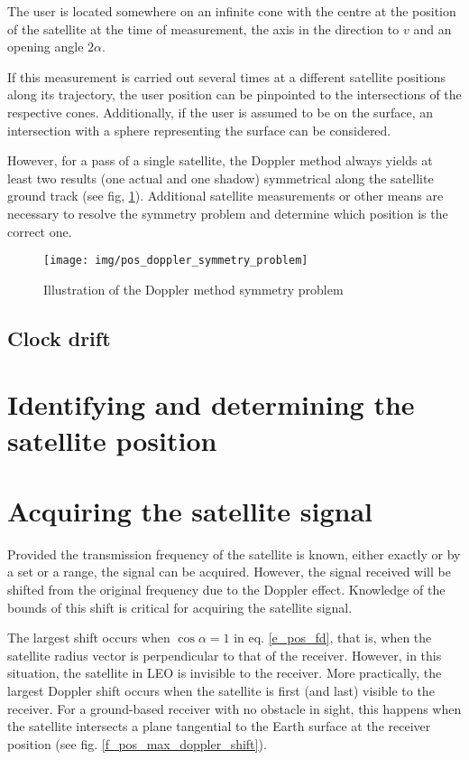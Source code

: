 The user is located somewhere on an infinite cone with the centre at the position of the satellite at the time of measurement, the axis in the direction to $v$ and an opening angle $2\alpha$.

If this measurement is carried out several times at a different satellite positions along its trajectory, the user position can be pinpointed to the intersections of the respective cones. Additionally, if the user is assumed to be on the surface, an intersection with a sphere representing the surface can be considered.

However, for a pass of a single satellite, the Doppler method always yields at least two results (one actual and one shadow) symmetrical along the satellite ground track (see fig, \ref{f_pos_doppler_symmetry_problem}). Additional satellite measurements or other means are necessary to resolve the symmetry problem and determine which position is the correct one.

\begin{figure}
    \centering
    \texttt{[image: img/pos\_doppler\_symmetry\_problem]}
    \caption{Illustration of the Doppler method symmetry problem\cite{sop09}}
    \label{f_pos_doppler_symmetry_problem}
\end{figure}

\subsection{Clock drift}


\section{Identifying and determining the satellite position}

\section{Acquiring the satellite signal}
Provided the transmission frequency of the satellite is known, either exactly or by a set or a range, the signal can be acquired. However, the signal received will be shifted from the original frequency due to the Doppler effect. Knowledge of the bounds of this shift is critical for acquiring the satellite signal.

The largest shift occurs when $\cos{\alpha} = 1$ in eq. \ref{e_pos_fd}, that is, when the satellite radius vector is perpendicular to that of the receiver. However, in this situation, the satellite in LEO is invisible to the receiver. More practically, the largest Doppler shift occurs when the satellite is first (and last) visible to the receiver. For a ground-based receiver with no obstacle in sight, this happens when the satellite intersects a plane tangential to the Earth surface at the receiver position (see fig. \ref{f_pos_max_doppler_shift}).

